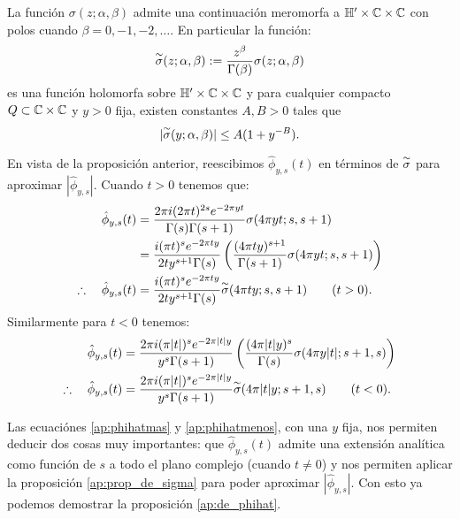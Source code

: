 \documentclass[../../tesis_maestria]{subfiles}
\begin{document}
\begin{prop}\label{ap:prop_de_sigma}%
  La funci\'on $\sigma(z;\alpha,\beta)$ admite una continuaci\'on meromorfa a $\mathbb{H}'\times\mathbb{C}\times\mathbb{C}$
  con polos cuando $\beta=0,-1,-2,\ldots$. En particular la funci\'on:
  \[
    \overset{\sim}{\sigma}(z;\alpha,\beta):=\frac{z^{\beta}}{\Gamma(\beta)}\sigma(z;\alpha,\beta)
  \]
  es una funci\'on holomorfa sobre $\mathbb{H}'\times\mathbb{C}\times\mathbb{C}$ y para cualquier compacto
  $Q\subset\mathbb{C}\times\mathbb{C}$ y $y>0$ fija, existen constantes $A,B>0$ tales que
  \[
    |\overset{\sim}{\sigma}(y;\alpha,\beta)|\leq A(1+y^{-B}).
  \]
\end{prop}%

En vista de la proposici\'on anterior, reescibimos $\hat{\phi}_{y,s}(t)$ en t\'erminos de $\overset{\sim}{\sigma}$ para
aproximar $|\hat{\phi}_{y,s}|$. Cuando $t>0$ tenemos que:
\begin{align}
  \hat{\phi}_{y,s}(t)
  &=\frac{2\pi i(2\pi t)^{2s}e^{-2\pi yt}}{\Gamma(s)\Gamma(s+1)}\sigma(4\pi yt;s,s+1)\nonumber\\
  &=\frac{i(\pi t)^se^{-2\pi ty}}{2ty^{s+1}\Gamma(s)}
    \left( \frac{(4\pi ty)^{s+1}}{\Gamma(s+1)}\sigma(4\pi yt;s,s+1) \right)\nonumber\\
  \therefore\quad \hat{\phi}_{y,s}(t)
  &=\frac{i(\pi t)^se^{-2\pi ty}}{2ty^{s+1}\Gamma(s)}\overset{\sim}{\sigma}(4\pi ty;s,s+1)\qquad(t>0).\label{ap:phihatmas}
\end{align}
Similarmente para $t<0$ tenemos:
\begin{align}
  \hat{\phi}_{y,s}(t)
  &=\frac{2\pi i(\pi |t|)^se^{-2\pi |t|y}}{y^s\Gamma(s+1)}
    \left( \frac{(4\pi |t|y)^{s}}{\Gamma(s)}\sigma(4\pi y|t|;s+1,s) \right)\nonumber\\
  \therefore\quad \hat{\phi}_{y,s}(t)
  &=\frac{2\pi i(\pi |t|)^se^{-2\pi |t|y}}{y^s\Gamma(s+1)}\overset{\sim}{\sigma}(4\pi |t|y;s+1,s)
    \qquad(t<0).\label{ap:phihatmenos}
\end{align}

Las ecuaci\'ones \eqref{ap:phihatmas} y \eqref{ap:phihatmenos}, con una $y$ fija, nos permiten deducir
dos cosas muy importantes: que $\hat{\phi}_{y,s}(t)$ admite una extensi\'on anal\'itica como funci\'on
de $s$ a todo el plano complejo (cuando $t\neq0$) y nos permiten aplicar la proposici\'on
\ref{ap:prop_de_sigma} para poder aproximar $|\hat{\phi}_{y,s}|$. Con esto ya podemos demostrar la
proposici\'on \ref{ap:de_phihat}.
\end{document}

